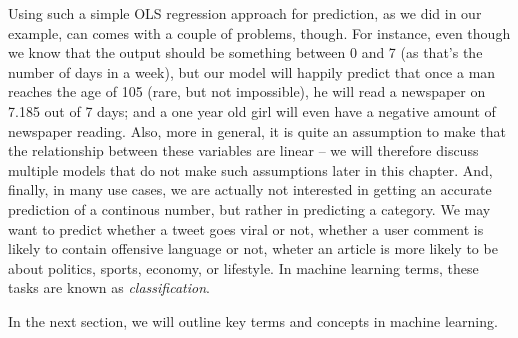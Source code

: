 Using such a simple OLS regression approach for prediction, as we did in our
example, can comes with a couple of problems, though.
For instance, even though we know that the output should be something between
0 and 7 (as that's the number of days in a week), but our model will happily
predict that once a man reaches the age of 105 (rare, but not impossible), he
will read a newspaper on 7.185 out of 7 days; and a one year old girl will
even have a negative amount of newspaper reading.
Also, more in general, it is quite an assumption to make that the relationship
between these variables are linear -- we will therefore discuss multiple
models that do not make such assumptions later in this chapter.
And, finally, in many use cases, we are actually not interested in getting
an accurate prediction of a continous number, but rather in predicting a
category. We may want to predict whether a tweet goes viral or not, whether
a user comment is likely to contain offensive language or not, wheter an article
is more likely to be about politics, sports, economy, or lifestyle.
In machine learning terms, these tasks are known as \emph{classification}.

In the next section, we will outline key terms and concepts in machine learning.

